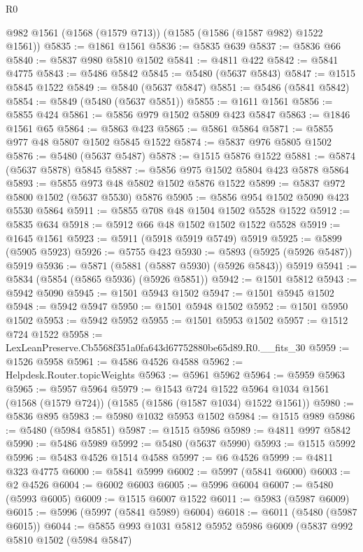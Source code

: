 \begin{lexlean}{R0}
\begin{coremodule}
    @982
    @1561
    (@1568 (@1579 @713))
    (@1585 (@1586 (@1587 @982) @1522 @1561))
@5835 := @1861 @1561
@5836 := @5835 @639
@5837 := @5836 @66
@5840 := @5837 @980 @5810 @1502
@5841 := @4811 @422
@5842 := @5841 @4775
@5843 := @5486 @5842
@5845 := @5480 (@5637 @5843)
@5847 := @1515 @5845 @1522
@5849 := @5840 (@5637 @5847)
@5851 := @5486 (@5841 @5842)
@5854 := @5849 (@5480 (@5637 @5851))
@5855 := @1611 @1561
@5856 := @5855 @424
@5861 := @5856 @979 @1502 @5809 @423 @5847
@5863 := @1846 @1561 @65
@5864 := @5863 @423
@5865 := @5861 @5864
@5871 := @5855 @977 @48 @5807 @1502 @5845 @1522
@5874 := @5837 @976 @5805 @1502
@5876 := @5480 (@5637 @5487)
@5878 := @1515 @5876 @1522
@5881 := @5874 (@5637 @5878) @5845
@5887 := @5856 @975 @1502 @5804 @423 @5878 @5864
@5893 := @5855 @973 @48 @5802 @1502 @5876 @1522
@5899 := @5837 @972 @5800 @1502 (@5637 @5530) @5876
@5905 := @5856 @954 @1502 @5090 @423 @5530 @5864
@5911 := @5855 @708 @48 @1504 @1502 @5528 @1522
@5912 := @5835 @634
@5918 := @5912 @66 @48 @1502 @1502 @1522 @5528
@5919 := @1645 @1561
@5923 := @5911 (@5918 @5919 @5749) @5919
@5925 := @5899 (@5905 @5923)
@5926 := @5755 @423
@5930 := @5893 (@5925 (@5926 @5487)) @5919
@5936 := @5871 (@5881 (@5887 @5930) (@5926 @5843)) @5919
@5941 := @5834 (@5854 (@5865 @5936) (@5926 @5851))
@5942 := @1501 @5812
@5943 := @5942 @5090
@5945 := @1501 @5943 @1502
@5947 := @1501 @5945 @1502
@5948 := @5942 @5947
@5950 := @1501 @5948 @1502
@5952 := @1501 @5950 @1502
@5953 := @5942 @5952
@5955 := @1501 @5953 @1502
@5957 := @1512 @724 @1522
@5958 := LexLeanPreserve.Cb5568f351a0fa643d67752880be65d89.R0.__fits_30
@5959 := @1526 @5958
@5961 := @4586 @4526 @4588
@5962 := Helpdesk.Router.topicWeights
@5963 := @5961 @5962
@5964 := @5959 @5963
@5965 := @5957 @5964
@5979 := @1543
    @724
    @1522
    @5964
    @1034
    @1561
    (@1568 (@1579 @724))
    (@1585 (@1586 (@1587 @1034) @1522 @1561))
@5980 := @5836 @895
@5983 := @5980 @1032 @5953 @1502
@5984 := @1515 @989
@5986 := @5480 (@5984 @5851)
@5987 := @1515 @5986
@5989 := @4811 @997 @5842
@5990 := @5486 @5989
@5992 := @5480 (@5637 @5990)
@5993 := @1515 @5992
@5996 := @5483 @4526 @1514 @4588
@5997 := @6 @4526
@5999 := @4811 @323 @4775
@6000 := @5841 @5999
@6002 := @5997 (@5841 @6000)
@6003 := @2 @4526
@6004 := @6002 @6003
@6005 := @5996 @6004
@6007 := @5480 (@5993 @6005)
@6009 := @1515 @6007 @1522
@6011 := @5983 (@5987 @6009)
@6015 := @5996 (@5997 (@5841 @5989) @6004)
@6018 := @6011 (@5480 (@5987 @6015))
@6044 := @5855
    @993
    @1031
    @5812
    @5952
    @5986
    @6009
    (@5837
      @992
      @5810
      @1502
      (@5984 @5847)

\end{coremodule}
\end{lexlean}

